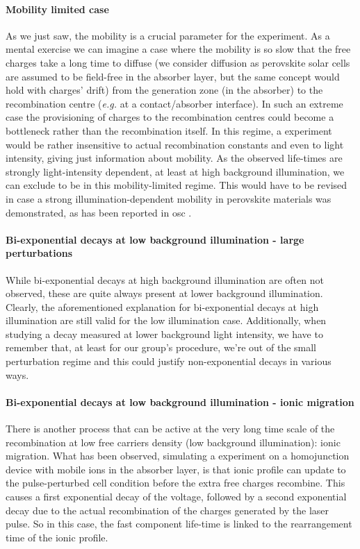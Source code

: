 	\paragraph{Mobility limited case}
	As we just saw, the mobility is a crucial parameter for the  experiment.
	As a mental exercise we can imagine a case where the mobility is so slow that the free charges take a long time to diffuse (we consider diffusion as perovskite solar cells are assumed to be field-free in the absorber layer, but the same concept would hold with charges' drift) from the generation zone (in the absorber) to the recombination centre (\textit{e.g.} at a contact/absorber interface).
	In such an extreme case the provisioning of charges to the recombination centres could become a bottleneck rather than the recombination itself.
	In this regime, a  experiment would be rather insensitive to actual recombination constants and even to light intensity, giving just information about mobility.
	As the observed  life-times are strongly light-intensity dependent, at least at high background illumination, we can exclude to be in this mobility-limited regime.
	This would have to be revised in case a strong illumination-dependent mobility in perovskite materials was demonstrated, as has been reported in \gls{osc} \cite{Eng2010,Shuttle2010}.
	
	\paragraph{Bi-exponential decays at low background illumination - large perturbations}
	While bi-exponential decays at high background illumination are often not observed, these are quite always present at lower background illumination.
	Clearly, the aforementioned explanation for bi-exponential decays at high illumination are still valid for the low illumination case.
	Additionally, when studying a decay measured at lower background light intensity, we have to remember that, at least for our group's  procedure, we're out of the small perturbation regime and this could justify non-exponential decays in various ways.
	
	\paragraph{Bi-exponential decays at low background illumination - ionic migration}
	There is another process that can be active at the very long time scale of the recombination at low free carriers density (low background illumination): ionic migration.
	What has been observed, simulating a  experiment on a homojunction device with mobile ions in the absorber layer, is that ionic profile can update to the pulse-perturbed cell condition before the extra free charges recombine.
	This causes a first exponential decay of the voltage, followed by a second exponential decay due to the actual recombination of the charges generated by the laser pulse.
	So in this case, the fast component life-time is linked to the rearrangement time of the ionic profile.
	
